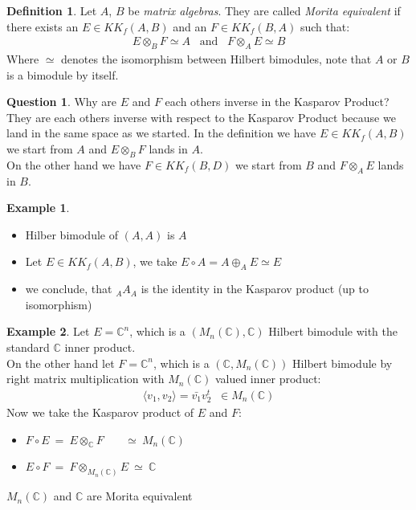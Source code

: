 \documentclass[a4paper]{article}
\theoremstyle{definition}
\newtheorem{definition}{Definition}
\theoremstyle{definition}
\newtheorem{question}{Question}
\theoremstyle{definition}
\newtheorem{example}{Example}
\theoremstyle{theorem}
\theoremstyle{theorem}
\theoremstyle{theorem}
\theoremstyle{definition}
\begin{document}
\begin{definition}
    Let $A$, $B$ be \textit{matrix algebras}. They are called \textit{Morita equivalent} if there
    exists an $E \in KK_f(A, B)$ and an $F \in KK_f(B, A)$ such that:
    \begin{align*}
        E \otimes _B F \simeq A \;\;\; \text{and} \;\;\; F \otimes _A E \simeq B
    \end{align*}
    Where $\simeq$ denotes the isomorphism between Hilbert bimodules, note that $A$ or $B$ is a bimodule by
    itself.
\end{definition}

\begin{question}
    Why are $E$ and $F$ each others inverse in the Kasparov Product? \\
    They are each others inverse with respect to the Kasparov Product because we land in the same space as we started.
    In the definition we have $E \in KK_f(A, B)$ we start from $A$ and $E \otimes _B F$ lands in $A$.\\
    On the other hand we have $F \in KK_f(B, D)$ we start from $B$ and $F \otimes _A E$ lands in $B$.
\end{question}

\begin{example}
    \
    \begin{itemize}
        \item Hilber bimodule of $(A,A)$ is $A$
        \item Let $E \in KK_f(A,B)$, we take $E \circ A = A\oplus _A E \simeq E$
        \item we conclude, that $_A A_A$ is the identity in the Kasparov product (up to isomorphism)
    \end{itemize}
\end{example}

\begin{example}
    Let $E = \mathbb{C}^n$, which is a $(M_n(\mathbb{C}), \mathbb{C})$ Hilbert bimodule with the
    standard $\mathbb{C}$ inner product.\\
    On the other hand let $F = \mathbb{C}^n$, which is a $(\mathbb{C}, M_n(\mathbb{C}))$ Hilbert
    bimodule by right matrix multiplication with $M_n(\mathbb{C})$ valued inner product:
    \begin{align*}
        \langle v_1, v_2\rangle =\bar{v_1}v_2^t \;\; \in M_n(\mathbb{C})
    \end{align*}
    Now we take the Kasparov product of $E$ and $F$:
   \begin{itemize}
        \item $F\circ E\ =\  E\otimes _{\mathbb{C}}F\ \;\;\;\;\;\; \simeq \  M_n(\mathbb{C})$
        \item $E\circ F\ =\ F\otimes _{M_n(\mathbb{C})}E\ \simeq\ \mathbb{C}$
    \end{itemize}
    $M_n(\mathbb{C})$ and $\mathbb{C}$ are Morita equivalent
\end{example}
\end{document}
